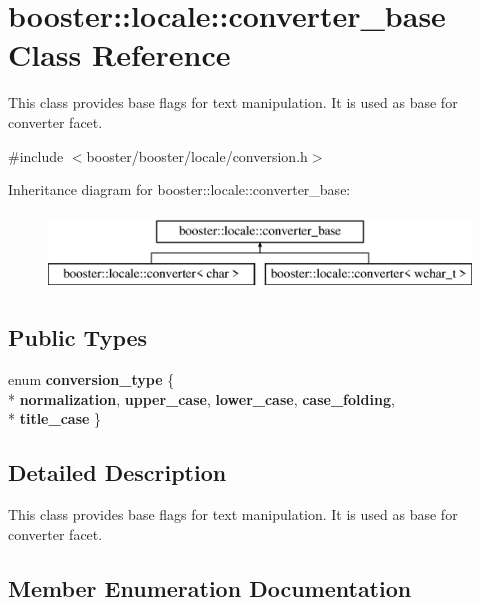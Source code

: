\section{booster\+:\+:locale\+:\+:converter\+\_\+base Class Reference}
\label{classbooster_1_1locale_1_1converter__base}


This class provides base flags for text manipulation. It is used as base for converter facet.  




{\ttfamily \#include $<$booster/booster/locale/conversion.\+h$>$}

Inheritance diagram for booster\+:\+:locale\+:\+:converter\+\_\+base\+:\begin{figure}[H]
\begin{center}
\leavevmode
\includegraphics[height=2.000000cm]{classbooster_1_1locale_1_1converter__base}
\end{center}
\end{figure}
\subsection*{Public Types}
\begin{DoxyCompactItemize}
\item 
enum {\bf conversion\+\_\+type} \{ \\*
{\bf normalization}, 
{\bf upper\+\_\+case}, 
{\bf lower\+\_\+case}, 
{\bf case\+\_\+folding}, 
\\*
{\bf title\+\_\+case}
 \}
\end{DoxyCompactItemize}


\subsection{Detailed Description}
This class provides base flags for text manipulation. It is used as base for converter facet. 

\subsection{Member Enumeration Documentation}
